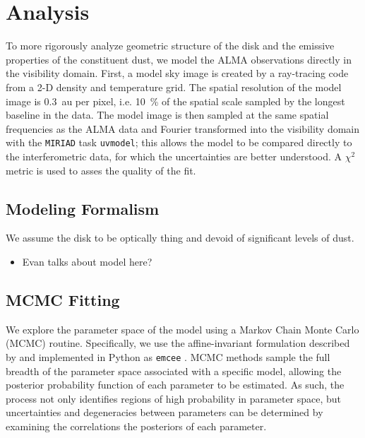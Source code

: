 \documentclass[12pt,oneside]{book}
\begin{document}
\chapter{Analysis}
To more rigorously analyze geometric structure of the disk and the emissive properties of the constituent dust, we model the ALMA observations directly in the visibility domain.
First, a model sky image is created by a ray-tracing code from a 2-D density and temperature grid. 
The spatial resolution of the model image is \SI{0.3}{au} per pixel, i.e. \SI{10}{\percent} of the spatial scale sampled by the longest baseline in the data.
The model image is then sampled at the same spatial frequencies as the ALMA data and Fourier transformed into the visibility domain with the \texttt{MIRIAD} task \texttt{uvmodel}; this allows the model to be compared directly to the interferometric data, for which the uncertainties are better understood.
A $\chi^2$ metric is used to asses the quality of the fit.

\section{Modeling Formalism}
We assume the disk to be optically thing and devoid of significant levels of dust.
\begin{itemize}
  \item Evan talks about model here?
\end{itemize}


\section{MCMC Fitting}
We explore the parameter space of the model using a Markov Chain Monte Carlo (MCMC) routine. Specifically, we use the affine-invariant formulation described by \cite{goodmanweare10} and implemented in Python as \texttt{emcee} \citep{foreman-mackey13}.  MCMC methods sample the full breadth of the parameter space associated with a specific model, allowing the posterior probability function of each parameter to be estimated. As such, the process not only identifies regions of high probability in parameter space, but uncertainties and degeneracies between parameters can be determined by examining the correlations the posteriors of each parameter.
\end{document}

